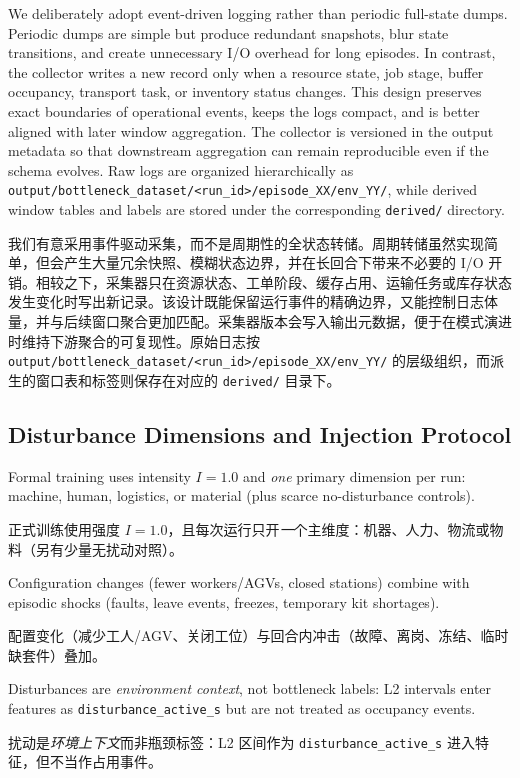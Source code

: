 \documentclass[12pt,a4paper,oneside,scheme=plain]{ctexrep}
\newcommand{\bip}[2]{%
  \par #1\par
  \nobreak\vspace{0.12em}%
  {\small\color{black!62}#2}\par
  \vspace{0.62em}%
}
\begin{document}
\bip
{We deliberately adopt event-driven logging rather than periodic full-state dumps. Periodic dumps are simple but produce redundant snapshots, blur state transitions, and create unnecessary I/O overhead for long episodes. In contrast, the collector writes a new record only when a resource state, job stage, buffer occupancy, transport task, or inventory status changes. This design preserves exact boundaries of operational events, keeps the logs compact, and is better aligned with later window aggregation. The collector is versioned in the output metadata so that downstream aggregation can remain reproducible even if the schema evolves. Raw logs are organized hierarchically as \texttt{output/bottleneck\_dataset/<run\_id>/episode\_XX/env\_YY/}, while derived window tables and labels are stored under the corresponding \texttt{derived/} directory.}
{我们有意采用事件驱动采集，而不是周期性的全状态转储。周期转储虽然实现简单，但会产生大量冗余快照、模糊状态边界，并在长回合下带来不必要的 I/O 开销。相较之下，采集器只在资源状态、工单阶段、缓存占用、运输任务或库存状态发生变化时写出新记录。该设计既能保留运行事件的精确边界，又能控制日志体量，并与后续窗口聚合更加匹配。采集器版本会写入输出元数据，便于在模式演进时维持下游聚合的可复现性。原始日志按 \texttt{output/bottleneck\_dataset/<run\_id>/episode\_XX/env\_YY/} 的层级组织，而派生的窗口表和标签则保存在对应的 \texttt{derived/} 目录下。}

\subsection[Disturbance Dimensions and Injection Protocol / 扰动维度与注入协议]{Disturbance Dimensions and Injection Protocol}
\label{sec:disturb}

\bip
{Formal training uses intensity $I=1.0$ and \emph{one} primary dimension per run: machine, human, logistics, or material (plus scarce no-disturbance controls).}
{正式训练使用强度 $I=1.0$，且每次运行只开\emph{一}个主维度：机器、人力、物流或物料（另有少量无扰动对照）。}

\bip
{Configuration changes (fewer workers/AGVs, closed stations) combine with episodic shocks (faults, leave events, freezes, temporary kit shortages).}
{配置变化（减少工人/AGV、关闭工位）与回合内冲击（故障、离岗、冻结、临时缺套件）叠加。}

\bip
{Disturbances are \emph{environment context}, not bottleneck labels: L2 intervals enter features as \texttt{disturbance\_active\_s} but are not treated as occupancy events.}
{扰动是\emph{环境上下文}而非瓶颈标签：L2 区间作为 \texttt{disturbance\_active\_s} 进入特征，但不当作占用事件。}
\end{document}

